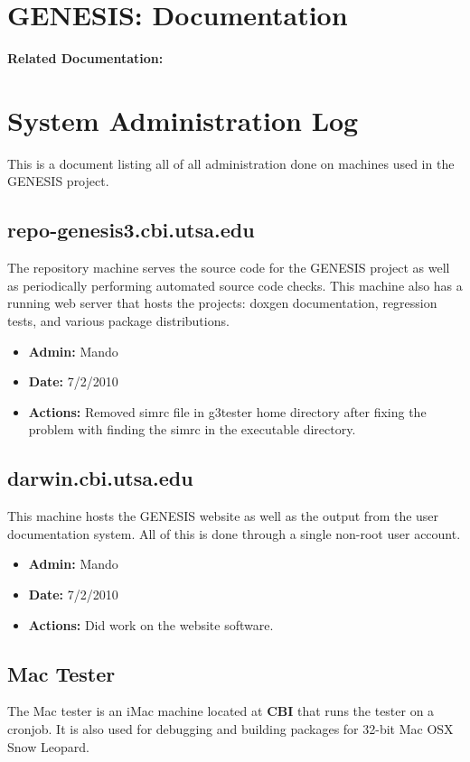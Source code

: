 \documentclass[12pt]{article}
\begin{document}
\section*{GENESIS: Documentation}

{\bf Related Documentation:}

\section*{System Administration Log}

This is a document listing all of all administration done on machines used in the GENESIS project.

\subsection*{repo-genesis3.cbi.utsa.edu}

The repository machine serves the source code for the GENESIS project as well as periodically performing automated source code checks. This machine also has a running web server that hosts the projects: doxgen documentation, regression tests, and various package distributions.

\begin{itemize}
\item[] {\bf Admin:} Mando
\item[] {\bf Date:} 7/2/2010 
\item[] {\bf Actions:} Removed simrc file in g3tester home directory after fixing the problem with finding the simrc in the executable directory.
\end{itemize}


\subsection*{darwin.cbi.utsa.edu}

This machine hosts the GENESIS website as well as the output from the user documentation system. All of this is done through a single non-root user account.

\begin{itemize}
\item[] {\bf Admin:} Mando
\item[] {\bf Date:} 7/2/2010
\item[] {\bf Actions:} Did work on the website software. 
\end{itemize}


\subsection*{Mac Tester}

The Mac tester is an iMac machine located at {\bf CBI} that runs the tester on a cronjob. It is also used for debugging and building packages for 32-bit Mac OSX Snow Leopard.
\end{document}
